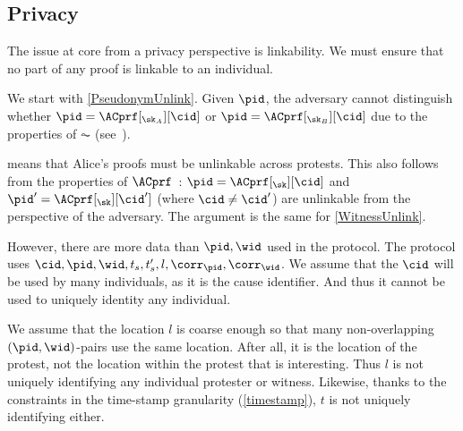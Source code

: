 \subsection{Privacy}

The issue at core from a privacy perspective is linkability.
We must ensure that no part of any proof is linkable to an individual.

We start with \cref{PseudonymUnlink}.
Given \(\pid\), the adversary cannot distinguish whether \(\pid = 
  \ACprf[_{\sk_A}][\cid]\) or \(\pid = \ACprf[_{\sk_B}][\cid]\) due to the 
properties of \(\AC\) (see~\cite{HowToWinTheCloneWars}).

 means that Alice's proofs must be unlinkable across 
protests.
This also follows from the properties of 
\(\ACprf\)~\cite{HowToWinTheCloneWars}: \(\pid =  \ACprf[_{\sk}][\cid]\) and 
\(\pid' = \ACprf[_{\sk}][\cid']\) (where \(\cid \neq \cid'\)) are unlinkable 
from the perspective of the adversary.
The argument is the same for \cref{WitnessUnlink}.

However, there are more data than \(\pid, \wid\) used in the protocol.
The protocol uses \(\cid, \pid, \wid, t_s, t_s', l, \corr_\pid, \corr_\wid\).
We assume that the \(\cid\) will be used by many individuals, as it is the 
cause identifier.
And thus it cannot be used to uniquely identity any individual.

We assume that the location \(l\) is coarse enough so that many non-overlapping 
\((\pid, \wid)\)-pairs use the same location.
After all, it is the location of the protest, not the location within the 
protest that is interesting.
Thus \(l\) is not uniquely identifying any individual protester or witness.
Likewise, thanks to the constraints in the time-stamp granularity 
(\cref{timestamp}), \(t\) is not uniquely identifying either.

